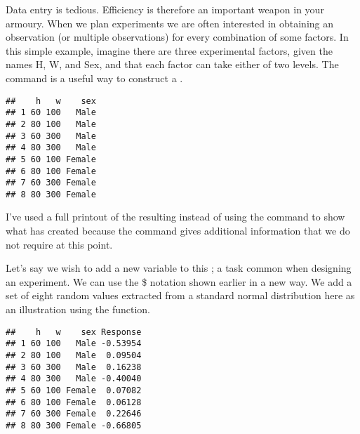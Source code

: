 Data entry is tedious. Efficiency is therefore an important weapon in your armoury. When we plan experiments we are often interested in obtaining an observation (or multiple observations) for every combination of some factors. In this simple example, imagine there are three experimental factors, given the names H, W, and Sex, and that each factor can take either of two levels. The  command is a useful way to construct a . 
\begin{knitrout}
\color{fgcolor}\begin{kframe}
\begin{alltt}
 \hlkwb{=} \hlstd{(}\hlstd{=}\hlstd{(}\hlstd{,}\hlstd{),} \hlstd{=}\hlstd{(}\hlstd{,} \hlstd{),} \hlstd{=}\hlstd{(}\hlstd{,} \hlstd{))}
\end{alltt}
\begin{verbatim}
##    h   w    sex
## 1 60 100   Male
## 2 80 100   Male
## 3 60 300   Male
## 4 80 300   Male
## 5 60 100 Female
## 6 80 100 Female
## 7 60 300 Female
## 8 80 300 Female
\end{verbatim}
\end{kframe}
\end{knitrout}
 
I've used a full printout of the resulting  instead of using the  command to show what \R{} has created because the  command gives additional information that we do not require at this point. 
 
Let's say we wish to add a new variable to this ; a task common when designing an experiment. We can use the \$ notation shown earlier in a new way. We add a set of eight random values extracted from a standard normal distribution here as an illustration using the  function. 
\begin{knitrout}
\color{fgcolor}\begin{kframe}
\begin{alltt}
\hlopt{$} \hlkwb{=} \hlstd{(}\hlstd{)}
\end{alltt}
\begin{verbatim}
##    h   w    sex Response
## 1 60 100   Male -0.53954
## 2 80 100   Male  0.09504
## 3 60 300   Male  0.16238
## 4 80 300   Male -0.40040
## 5 60 100 Female  0.07082
## 6 80 100 Female  0.06128
## 7 60 300 Female  0.22646
## 8 80 300 Female -0.66805
\end{verbatim}
\end{kframe}
\end{knitrout}
 
